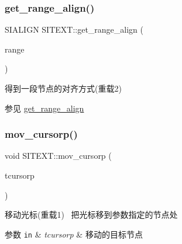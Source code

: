 \subsubsection{\texorpdfstring{get\+\_\+range\+\_\+align()}{get\_range\_align()}\hspace{0.1cm}{\footnotesize\ttfamily [2/2]}}
{\footnotesize\ttfamily S\+I\+A\+L\+I\+GN S\+I\+T\+E\+X\+T\+::get\+\_\+range\+\_\+align (\begin{DoxyParamCaption}\item[{const \hyperlink{struct_s_i_r_a_n_g_e}{S\+I\+R\+A\+N\+GE} \&}]{range }\end{DoxyParamCaption})\hspace{0.3cm}{\ttfamily [inline]}}



得到一段节点的对齐方式(重载2) 

\begin{DoxySeeAlso}{参见}
\hyperlink{class_s_i_t_e_x_t_a43b43ba8dc025b49555f527734508465}{get\+\_\+range\+\_\+align} 
\end{DoxySeeAlso}
\mbox{\label{class_s_i_t_e_x_t_a79c57242ea31d6792f319aaf5ac8d8f0}} 
\subsubsection{\texorpdfstring{mov\+\_\+cursorp()}{mov\_cursorp()}\hspace{0.1cm}{\footnotesize\ttfamily [1/3]}}
{\footnotesize\ttfamily void S\+I\+T\+E\+X\+T\+::mov\+\_\+cursorp (\begin{DoxyParamCaption}\item[{\hyperlink{class_s_i_c_h_a_r_n_o_d_e}{S\+I\+C\+U\+R\+S\+O\+RP}}]{tcursorp }\end{DoxyParamCaption})\hspace{0.3cm}{\ttfamily [inline]}}



移动光标(重载1)~\newline
把光标移到参数指定的节点处 


\begin{DoxyParams}[1]{参数}
\mbox{\tt in}  & {\em tcursorp} & 移动的目标节点 \\
\hline
\end{DoxyParams}
\mbox{\label{class_s_i_t_e_x_t_afdf96b3841922ef6436666b9e7bc884d}} 
